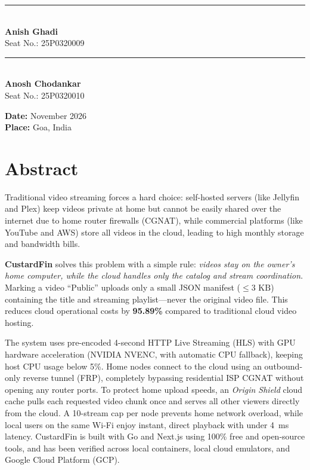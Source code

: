 \vspace{2cm}
\noindent
\begin{minipage}[t]{0.45\textwidth}
    \rule{\textwidth}{0.4pt}\\
    \textbf{Anish Ghadi}\\
    Seat No.: 25P0320009
\end{minipage}
\hfill
\begin{minipage}[t]{0.45\textwidth}
    \rule{\textwidth}{0.4pt}\\
    \textbf{Anosh Chodankar}\\
    Seat No.: 25P0320010
\end{minipage}

\vfill
\noindent
\textbf{Date:} November 2026\\
\textbf{Place:} Goa, India

\chapter*{Abstract}

Traditional video streaming forces a hard choice: self-hosted servers (like Jellyfin and Plex) keep videos private at home but cannot be easily shared over the internet due to home router firewalls (CGNAT), while commercial platforms (like YouTube and AWS) store all videos in the cloud, leading to high monthly storage and bandwidth bills.

\textbf{CustardFin} solves this problem with a simple rule: \textit{videos stay on the owner's home computer, while the cloud handles only the catalog and stream coordination}. Marking a video ``Public'' uploads only a small JSON manifest ($\le 3\text{ KB}$) containing the title and streaming playlist—never the original video file. This reduces cloud operational costs by \textbf{95.89\%} compared to traditional cloud video hosting.

The system uses pre-encoded 4-second HTTP Live Streaming (HLS) with GPU hardware acceleration (NVIDIA NVENC, with automatic CPU fallback), keeping host CPU usage below 5\%. Home nodes connect to the cloud using an outbound-only reverse tunnel (FRP), completely bypassing residential ISP CGNAT without opening any router ports. To protect home upload speeds, an \textit{Origin Shield} cloud cache pulls each requested video chunk once and serves all other viewers directly from the cloud. A 10-stream cap per node prevents home network overload, while local users on the same Wi-Fi enjoy instant, direct playback with under 4~ms latency. CustardFin is built with Go and Next.js using 100\% free and open-source tools, and has been verified across local containers, local cloud emulators, and Google Cloud Platform (GCP).

\clearpage

\tableofcontents
\clearpage

